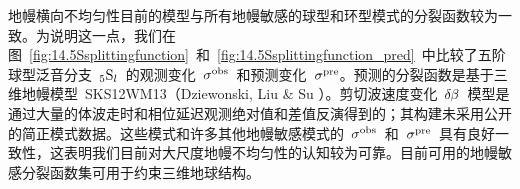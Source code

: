 地幔横向不均匀性目前的模型与所有地幔敏感的球型和环型模式的分裂函数较为一致。为说明这一点，我们在图~\ref{fig:14.5Ssplittingfunction}~和~\ref{fig:14.5Ssplittingfunction_pred}~中比较了五阶球型泛音分支~${}_5{\rm S}_l$~的观测变化~$\sigma^{\rm obs}$~和预测变化~$\sigma^{\rm pre}$。预测的分裂函数是基于三维地幔模型~SKS12WM13（Dziewonski, Liu \& Su \citeyear{liu&dziewonski96}）。剪切波速度变化~$\delta\hspace{-0.2 mm}\beta$~模型是通过大量的体波走时和相位延迟观测绝对值和差值反演得到的；其构建未采用公开的简正模式数据。这些模式和许多其他地幔敏感模式的~$\sigma^{\rm obs}$~和~$\sigma^{\rm pre}$~具有良好一致性，这表明我们目前对大尺度地幔不均匀性的认知较为可靠。目前可用的地幔敏感分裂函数集可用于约束三维地球结构。

